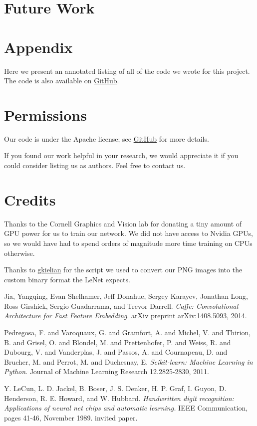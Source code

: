 \documentclass[leqno]{article}
\begin{document}
\section{Future Work}

\section{Appendix}
Here we present an annotated listing of all of the code we wrote for this
project. The code is also available on \href{http://github.com/darylsew/potato}{GitHub}.

\section{Permissions}
Our code is under the Apache license; see
\href{http://github.com/darylsew/potato}{GitHub} for more details.

If you found our work helpful in your research, we would appreciate it if you could consider
listing us as authors. Feel free to contact us.

\section{Credits}
Thanks to the Cornell Graphics and Vision lab for donating a tiny amount of GPU
power for us to train our network. We did not have access to Nvidia GPUs, so we
would have had to spend orders of magnitude more time training on CPUs
otherwise.

Thanks to
\href{https://github.com/gskielian/JPG-PNG-to-MNIST-NN-Format/blob/master/LICENSE}{gkielian}
for the script we used to convert our PNG images into the custom binary format
the LeNet expects.

\begin{thebibliography}{9}
Jia, Yangqing, Evan Shelhamer, Jeff Donahue, Sergey Karayev, Jonathan Long, Ross Girshick, Sergio Guadarrama, and Trevor Darrell.
\textit{Caffe: Convolutional Architecture for Fast Feature Embedding}.
arXiv preprint arXiv:1408.5093, 2014.


Pedregosa, F. and Varoquaux, G. and Gramfort, A. and Michel, V.
         and Thirion, B. and Grisel, O. and Blondel, M. and Prettenhofer, P.
         and Weiss, R. and Dubourg, V. and Vanderplas, J. and Passos, A. and
         Cournapeau, D. and Brucher, M. and Perrot, M. and Duchesnay, E.
         \textit{Scikit-learn: Machine Learning in Python}. Journal of Machine
         Learning Research 12.2825-2830, 2011.

   Y. LeCun, L. D. Jackel, B. Boser, J. S. Denker, H. P. Graf, I. Guyon, D.
   Henderson, R. E. Howard, and W. Hubbard. \textit{Handwritten digit
   recognition: Applications of neural net chips and automatic learning.} IEEE Communication, pages 41-46, November 1989. invited paper.
\end{thebibliography}
\end{document}
